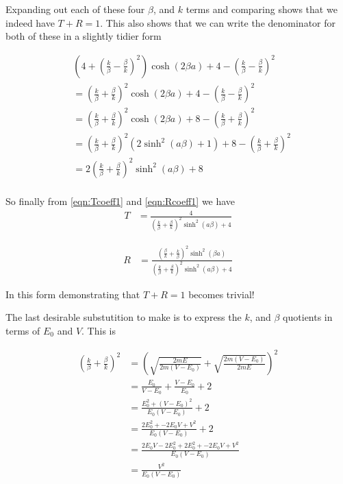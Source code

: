 \documentclass{article}
\begin{document}
Expanding out each of these four $\beta$, and $k$ terms and comparing shows that
we indeed have $T + R = 1$.  This also shows that we can write the denominator for both of
these 
in a 
slightly tidier form

\begin{align*}
&\left(4 + \left( \frac{k}{\beta} -\frac{\beta}{k} \right)^2 \right)
\cosh(2\beta a)
+ 
4 - \left(\frac{k}{\beta} - \frac{\beta}{k} \right)^2  \\
&=
\left( \frac{k}{\beta} +\frac{\beta}{k} \right)^2 
\cosh(2\beta a)
+ 
4 - \left(\frac{k}{\beta} - \frac{\beta}{k} \right)^2  \\
&=
\left( \frac{k}{\beta} +\frac{\beta}{k} \right)^2 
\cosh(2\beta a)
+ 
8 - \left(\frac{k}{\beta} + \frac{\beta}{k} \right)^2  \\
&=
\left( \frac{k}{\beta} +\frac{\beta}{k} \right)^2 
\left( 2 \sinh^2(a \beta) + 1\right)
+ 
8 - \left(\frac{k}{\beta} + \frac{\beta}{k} \right)^2  \\
&=
2 \left( \frac{k}{\beta} +\frac{\beta}{k} \right)^2 
\sinh^2(a \beta) + 8 \\
\end{align*}

So finally from \ref{eqn:Tcoeff1} and \ref{eqn:Rcoeff1} we have
\begin{align}
T 
&= \frac{4} { 
\left( \frac{k}{\beta} +\frac{\beta}{k} \right)^2 
\sinh^2(a \beta) + 4
}
\end{align}

\begin{align}
R 
&= \frac{ 
\left(\frac{\beta}{k} + \frac{k}{\beta} \right)^2 
\sinh^2( \beta a)} { 
\left( \frac{k}{\beta} +\frac{\beta}{k} \right)^2 
\sinh^2(a \beta) + 4 
}
\end{align}

In this form demonstrating that $T + R=1$ becomes trivial!

The last desirable substutition to make is to express the $k$, and $\beta$ quotients in terms of $E_0$ and $V$.  This is

\begin{align*}
\left(\frac{k}{\beta} + \frac{\beta}{k}\right)^2
&=
\left(\sqrt{\frac{2mE}{2m(V-E_0)}} + \sqrt{\frac{2m(V-E_0)}{2mE}}\right)^2 \\
&=
\frac{E_0}{V-E_0} + \frac{V-E_0}{E_0} + 2 \\
&=
\frac{E_0^2 + (V-E_0)^2}{E_0(V-E_0)} + 2 \\
&=
\frac{2 E_0^2 + -2 E_0 V + V^2 }{E_0(V-E_0)} + 2 \\
&=
\frac{2 E_0 V -2 E_0^2 + 2 E_0^2 + -2 E_0 V + V^2 }{E_0(V-E_0)} \\
&=
\frac{V^2 }{E_0(V-E_0)} \\
\end{align*}
\end{document}
